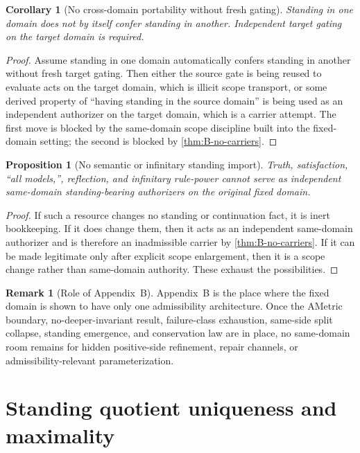 \documentclass[11pt]{article}
\theoremstyle{plain}
\newtheorem{proposition}[theorem]{Proposition}
\newtheorem{corollary}[theorem]{Corollary}
\theoremstyle{definition}
\newtheorem{remark}[theorem]{Remark}
\begin{document}
\begin{corollary}[No cross-domain portability without fresh gating]
Standing in one domain does not by itself confer standing in another. Independent target gating on the target domain is required.
\end{corollary}

\begin{proof}
Assume standing in one domain automatically confers standing in another without fresh target gating. Then either the source gate is being reused to evaluate acts on the target domain, which is illicit scope transport, or some derived property of ``having standing in the source domain'' is being used as an independent authorizer on the target domain, which is a carrier attempt. The first move is blocked by the same-domain scope discipline built into the fixed-domain setting; the second is blocked by \cref{thm:B-no-carriers}.
\end{proof}

\begin{proposition}[No semantic or infinitary standing import]
\label{prop:B-no-semantic-import}
Truth, satisfaction, ``all models,'', reflection, and infinitary rule-power cannot serve as independent same-domain standing-bearing authorizers on the original fixed domain.
\end{proposition}

\begin{proof}
If such a resource changes no standing or continuation fact, it is inert bookkeeping. If it does change them, then it acts as an independent same-domain authorizer and is therefore an inadmissible carrier by \cref{thm:B-no-carriers}. If it can be made legitimate only after explicit scope enlargement, then it is a scope change rather than same-domain authority. These exhaust the possibilities.
\end{proof}

\begin{remark}[Role of Appendix~B]
Appendix~B is the place where the fixed domain is shown to have only one admissibility architecture. Once the AMetric boundary, no-deeper-invariant result, failure-class exhaustion, same-side split collapse, standing emergence, and conservation law are in place, no same-domain room remains for hidden positive-side refinement, repair channels, or admissibility-relevant parameterization.
\end{remark}

\section{Standing quotient uniqueness and maximality}
\label{app:quotient}
\end{document}

